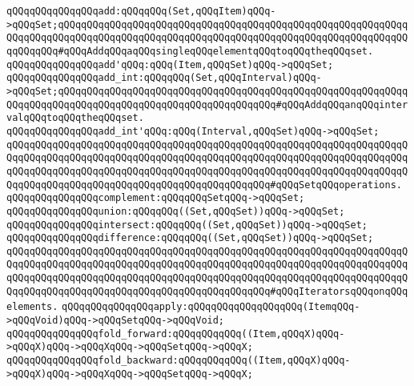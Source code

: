 \newline
\verb|qQQqqQQqqQQqqQQqadd:qQQqqQQq(Set,qQQqItem)qQQq->qQQqSet;qQQqqQQqqQQqqQQqqQQqqQQqqQQqqQQqqQQqqQQqqQQqqQQqqQQqqQQqqQQqqQQqqQQqqQQqqQQqqQQqqQQqqQQqqQQqqQQqqQQqqQQqqQQqqQQqqQQqqQQqqQQqqQQqqQQqqQQqqQQq#qQQqAddqQQqaqQQqsingleqQQqelementqQQqtoqQQqtheqQQqset.|\newline
\verb|qQQqqQQqqQQqqQQqadd'qQQq:qQQq(Item,qQQqSet)qQQq->qQQqSet;|\newline
\newline
\verb|qQQqqQQqqQQqqQQqadd_int:qQQqqQQq(Set,qQQqInterval)qQQq->qQQqSet;qQQqqQQqqQQqqQQqqQQqqQQqqQQqqQQqqQQqqQQqqQQqqQQqqQQqqQQqqQQqqQQqqQQqqQQqqQQqqQQqqQQqqQQqqQQqqQQqqQQqqQQqqQQq#qQQqAddqQQqanqQQqintervalqQQqtoqQQqtheqQQqset.|\newline
\verb|qQQqqQQqqQQqqQQqadd_int'qQQq:qQQq(Interval,qQQqSet)qQQq->qQQqSet;|\newline
\newline
\verb|qQQqqQQqqQQqqQQqqQQqqQQqqQQqqQQqqQQqqQQqqQQqqQQqqQQqqQQqqQQqqQQqqQQqqQQqqQQqqQQqqQQqqQQqqQQqqQQqqQQqqQQqqQQqqQQqqQQqqQQqqQQqqQQqqQQqqQQqqQQqqQQqqQQqqQQqqQQqqQQqqQQqqQQqqQQqqQQqqQQqqQQqqQQqqQQqqQQqqQQqqQQqqQQqqQQqqQQqqQQqqQQqqQQqqQQqqQQqqQQqqQQqqQQqqQQqqQQq#qQQqSetqQQqoperations.|\newline
\verb|qQQqqQQqqQQqqQQqcomplement:qQQqqQQqSetqQQq->qQQqSet;|\newline
\verb|qQQqqQQqqQQqqQQqunion:qQQqqQQq((Set,qQQqSet))qQQq->qQQqSet;|\newline
\verb|qQQqqQQqqQQqqQQqintersect:qQQqqQQq((Set,qQQqSet))qQQq->qQQqSet;|\newline
\verb|qQQqqQQqqQQqqQQqdifference:qQQqqQQq((Set,qQQqSet))qQQq->qQQqSet;|\newline
\newline
\verb|qQQqqQQqqQQqqQQqqQQqqQQqqQQqqQQqqQQqqQQqqQQqqQQqqQQqqQQqqQQqqQQqqQQqqQQqqQQqqQQqqQQqqQQqqQQqqQQqqQQqqQQqqQQqqQQqqQQqqQQqqQQqqQQqqQQqqQQqqQQqqQQqqQQqqQQqqQQqqQQqqQQqqQQqqQQqqQQqqQQqqQQqqQQqqQQqqQQqqQQqqQQqqQQqqQQqqQQqqQQqqQQqqQQqqQQqqQQqqQQqqQQqqQQqqQQqqQQq#qQQqIteratorsqQQqonqQQqelements.|\newline
\verb|qQQqqQQqqQQqqQQqapply:qQQqqQQqqQQqqQQqqQQq(ItemqQQq->qQQqVoid)qQQq->qQQqSetqQQq->qQQqVoid;|\newline
\verb|qQQqqQQqqQQqqQQqfold_forward:qQQqqQQqqQQq((Item,qQQqX)qQQq->qQQqX)qQQq->qQQqXqQQq->qQQqSetqQQq->qQQqX;|\newline
\verb|qQQqqQQqqQQqqQQqfold_backward:qQQqqQQqqQQq((Item,qQQqX)qQQq->qQQqX)qQQq->qQQqXqQQq->qQQqSetqQQq->qQQqX;|\newline
